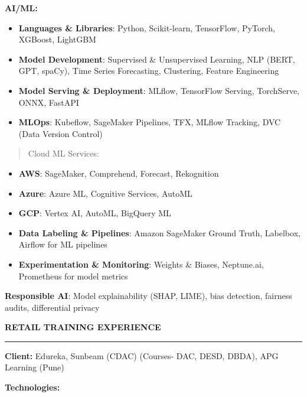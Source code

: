 \documentclass[a4paper]{article}
\begin{document}
\textbf{AI/ML:}

\begin{itemize}
\item
  \textbf{Languages \& Libraries}: Python, Scikit-learn, TensorFlow,
  PyTorch, XGBoost, LightGBM
\item
  \textbf{Model Development}: Supervised \& Unsupervised Learning, NLP
  (BERT, GPT, spaCy), Time Series Forecasting, Clustering, Feature
  Engineering
\item
  \textbf{Model Serving \& Deployment}: MLflow, TensorFlow Serving,
  TorchServe, ONNX, FastAPI
\item
  \textbf{MLOps}: Kubeflow, SageMaker Pipelines, TFX, MLflow Tracking,
  DVC (Data Version Control)
\end{itemize}

\begin{quote}
Cloud ML Services:
\end{quote}

\begin{itemize}
\item
  \textbf{AWS}: SageMaker, Comprehend, Forecast, Rekognition
\item
  \textbf{Azure}: Azure ML, Cognitive Services, AutoML
\item
  \textbf{GCP}: Vertex AI, AutoML, BigQuery ML
\item
  \textbf{Data Labeling \& Pipelines}: Amazon SageMaker Ground Truth,
  Labelbox, Airflow for ML pipelines
\item
  \textbf{Experimentation \& Monitoring}: Weights \& Biases, Neptune.ai,
  Prometheus for model metrics
\end{itemize}

\textbf{Responsible AI}: Model explainability (SHAP, LIME), bias
detection, fairness audits, differential privacy


\begin{center}
  \textbf{RETAIL TRAINING EXPERIENCE}
  \rule{\textwidth}{0.4pt}  %
\end{center}

\textbf{Client:} Edureka, Sunbeam (CDAC) (Courses- DAC, DESD, DBDA), APG
Learning (Pune)

\textbf{Technologies:}
\end{document}
